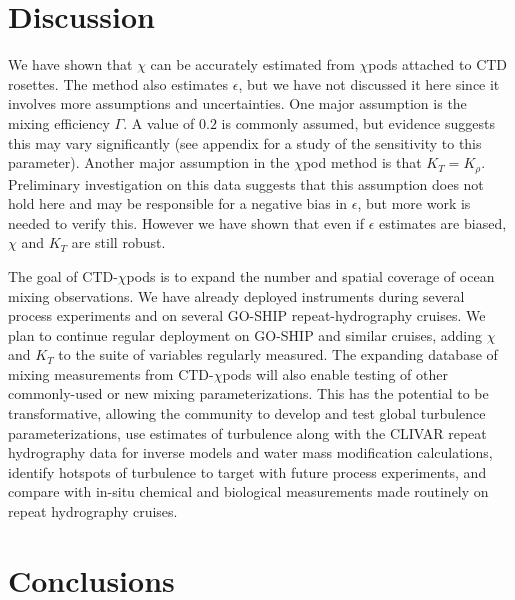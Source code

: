 \documentclass{ametsoc}
\begin{document}
\section{Discussion}

We have shown that $\chi$ can be accurately estimated from $\chi$pods attached to CTD rosettes. The method also estimates $\epsilon$, but we have not discussed it here since it involves more assumptions and uncertainties. One major assumption is the mixing efficiency $\Gamma$. A value of $0.2$ is commonly assumed, but evidence suggests this may vary significantly (see appendix for a study of the sensitivity to this parameter). Another major assumption in the $\chi$pod method is that $K_T=K_{\rho}$. Preliminary investigation on this data suggests that this assumption does not hold here and may be responsible for a negative bias in $\epsilon$, but more work is needed to verify this. However we have shown that even if $\epsilon$ estimates are biased, $\chi$ and $K_T$ are still robust.

The goal of CTD-$\chi$pods is to expand the number and spatial coverage of ocean mixing observations. We have already deployed instruments during several process experiments and on several GO-SHIP repeat-hydrography cruises. We plan to continue regular deployment on GO-SHIP and similar cruises, adding $\chi$ and $K_T$ to the suite of variables regularly measured. The expanding database of mixing measurements from CTD-$\chi$pods will also enable testing of other commonly-used or new mixing parameterizations. This has the potential to be transformative, allowing the community to 
develop and test global turbulence parameterizations, use estimates of turbulence along with the CLIVAR repeat hydrography data for inverse models and water mass modification calculations, identify hotspots of turbulence to target with future process experiments, and compare with in-situ chemical and biological measurements made routinely on repeat hydrography cruises.


\section{Conclusions}
\end{document}
